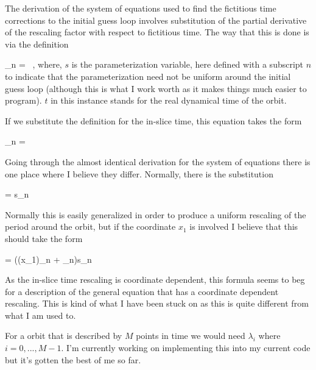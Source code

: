 The derivation of the system of equations used to find the fictitious time
corrections to the initial guess loop involves substitution of the
partial derivative of the rescaling factor with respect to fictitious time.
The way that this is done is via the definition

\beq
\lambda_n =  \, ,
\eeq
where, $s$ is the parameterization variable, here defined with a subscript $n$
to indicate that the parameterization need not be uniform around the initial guess
loop (although this is what I work worth as it makes things much easier to program).
$t$ in this instance stands for the real dynamical time of the orbit.

If we substitute the definition for the in-slice time, this equation takes the form

\beq
\lambda_n = 
\eeq

Going through the almost identical derivation for the system of equations there
is one place where I believe they differ. Normally, there is the substitution

\beq
\delta \tn =  \Delta s_n \delta \tau
\eeq

Normally this is easily generalized in order to produce a uniform rescaling of the period
around the orbit,
but if the coordinate $x_1$ is involved I believe that this should take the form

\beq \label{e-inslicevarmeth}
\delta \tn = ((x_1)_n +  \lambda_n)\Delta s_n \delta \tau
\eeq

As the in-slice time rescaling is coordinate dependent, this formula seems to beg for a description
of the general equation that has a coordinate dependent rescaling. This is kind of what I have been stuck on
as this is quite different from what I am used to.

For a orbit that is described by $M$ points in time we would need ${\lambda_i}$ where $i = 0, ... , M-1$.
I'm currently working on implementing this into my current code but it's gotten the best of me so far.


